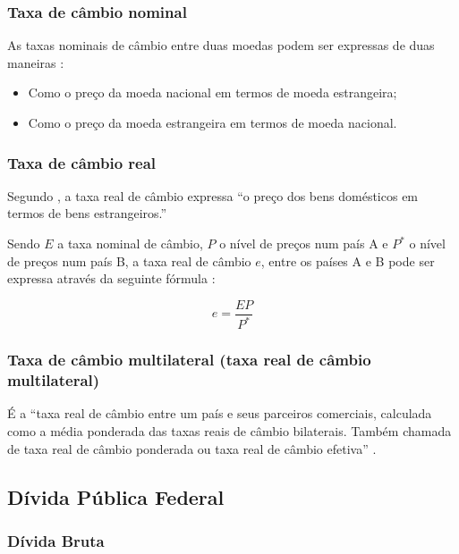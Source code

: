 \documentclass[
	10pt,				%
	openright,			%
	twoside,			%
	a5paper,			%
	english,			%
	french,				%
	spanish,			%
	brazil				%
	]{abntex2}
\begin{document}
\subsubsection{Taxa de câmbio nominal}\label{taxa-de-cuxe2mbio-nominal}

As taxas nominais de câmbio entre duas moedas podem ser expressas de
duas maneiras \cite[p.~354]{blanchard}:

\begin{itemize}
\tightlist
\item
  Como o preço da moeda nacional em termos de moeda estrangeira;
\item
  Como o preço da moeda estrangeira em termos de moeda nacional.
\end{itemize}

\subsubsection{Taxa de câmbio real}\label{taxa-de-cuxe2mbio-real}

Segundo \cite[p.~356]{blanchard}, a taxa real de câmbio expressa ``o
preço dos bens domésticos em termos de bens estrangeiros.''

Sendo \(E\) a taxa nominal de câmbio, \(P\) o nível de preços num país A
e \(P^*\) o nível de preços num país B, a taxa real de câmbio \(e\),
entre os países A e B pode ser expressa através da seguinte fórmula
\cite[p.~356]{blanchard}:

\[e = \frac{EP}{P^*}\]

\subsubsection{Taxa de câmbio multilateral (taxa real de câmbio
multilateral)}\label{taxa-de-cuxe2mbio-multilateral-taxa-real-de-cuxe2mbio-multilateral}

É a ``taxa real de câmbio entre um país e seus parceiros comerciais,
calculada como a média ponderada das taxas reais de câmbio bilaterais.
Também chamada de taxa real de câmbio ponderada ou taxa real de câmbio
efetiva'' \cite[p.~583]{blanchard}.

\subsection{Dívida Pública Federal}\label{duxedvida-puxfablica-federal}

\subsubsection{Dívida Bruta}\label{duxedvida-bruta}
\end{document}

